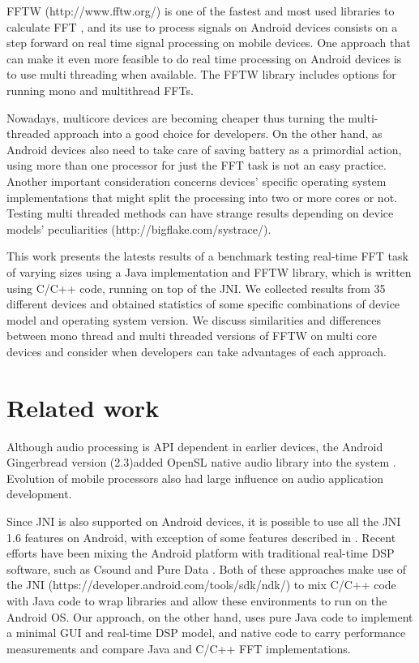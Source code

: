 \documentclass[12pt]{article}
\begin{document}
FFTW (http://www.fftw.org/) is one of the fastest and most used libraries to
calculate FFT \citep{6118781}, and its use to process signals on Android
devices consists on a step forward on real time signal processing on mobile
devices. One approach that can make it even more feasible to do real time
processing on Android devices is to use multi threading when available. The
FFTW library includes options for running mono and multithread FFTs.


Nowadays, multicore devices are becoming cheaper thus turning the
multi-threaded approach into a good choice for developers. On the other hand,
as Android devices also need to take care of saving battery as a primordial
action, using more than one processor for just the FFT task is not an easy
practice. Another important consideration concerns devices' specific operating
system implementations that might split the processing into two or more cores
or not. Testing multi threaded methods can have strange results depending on
device models' peculiarities (http://bigflake.com/systrace/).

This work presents the latests results of a benchmark  testing real-time FFT
task of varying sizes using a Java implementation and FFTW library, which is
written using C/C++ code, running on top of the JNI.
We collected results from 35 different devices and obtained statistics of some
specific combinations of  device model and operating system version. We
discuss similarities and differences between mono thread and multi threaded
versions of FFTW on multi core devices and consider when developers can  take
advantages of each approach.

\section{Related work}

Although audio processing is API dependent in earlier devices, the Android
Gingerbread version (2.3)added OpenSL native audio library into the system
\citep{Pathak2011,LazzaLAC}. Evolution of mobile processors also had large
influence on audio application development. 

Since JNI is also supported on Android devices, it is possible to use all the
JNI 1.6 features on Android, with exception of some features described in
\cite{MakingMusicalApps}.  Recent  efforts have been mixing the Android
platform with traditional real-time DSP software, such as Csound
\citep{LazzaLAC} and Pure  Data \citep{MakingMusicalApps}. Both of these
approaches make use of the JNI (https://developer.android.com/tools/sdk/ndk/)
to mix C/C++ code with Java code to wrap libraries and allow these
environments to run on the Android OS.  Our approach, on the other hand, uses
pure Java code to implement a minimal GUI and real-time DSP model, and native
code to carry performance measurements and compare Java and C/C++ FFT
implementations.
\end{document}

